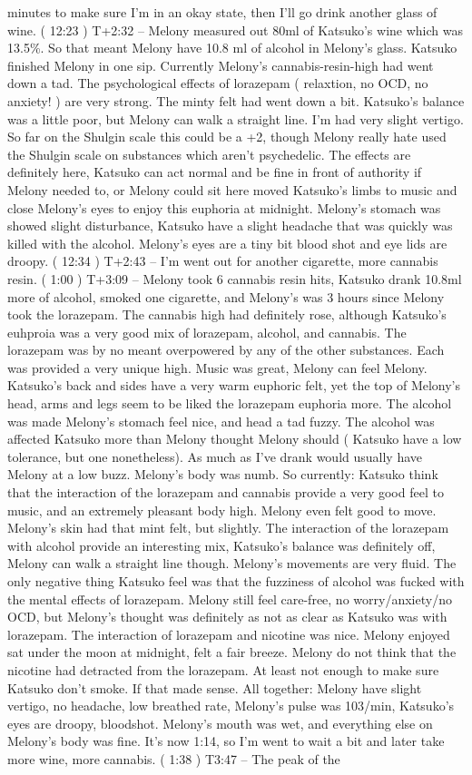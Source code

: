 \documentclass[12pt]{book}
\begin{document}
minutes to make sure I'm in an okay state, then I'll go drink another glass of wine. ( 12:23 ) T+2:32 -- Melony measured out 80ml of Katsuko's wine which was 13.5\%. So that meant Melony have 10.8 ml of alcohol in Melony's glass. Katsuko finished Melony in one sip. Currently Melony's cannabis-resin-high had went down a tad. The psychological effects of lorazepam ( relaxtion, no OCD, no anxiety! ) are very strong. The minty felt had went down a bit. Katsuko's balance was a little poor, but Melony can walk a straight line. I'm had very slight vertigo. So far on the Shulgin scale this could be a +2, though Melony really hate used the Shulgin scale on substances which aren't psychedelic. The effects are definitely here, Katsuko can act normal and be fine in front of authority if Melony needed to, or Melony could sit here moved Katsuko's limbs to music and close Melony's eyes to enjoy this euphoria at midnight. Melony's stomach was showed slight disturbance, Katsuko have a slight headache that was quickly was killed with the alcohol. Melony's eyes are a tiny bit blood shot and eye lids are droopy. ( 12:34 ) T+2:43 -- I'm went out for another cigarette, more cannabis resin. ( 1:00 ) T+3:09 -- Melony took 6 cannabis resin hits, Katsuko drank 10.8ml more of alcohol, smoked one cigarette, and Melony's was 3 hours since Melony took the lorazepam. The cannabis high had definitely rose, although Katsuko's euhproia was a very good mix of lorazepam, alcohol, and cannabis. The lorazepam was by no meant overpowered by any of the other substances. Each was provided a very unique high. Music was great, Melony can feel Melony. Katsuko's back and sides have a very warm euphoric felt, yet the top of Melony's head, arms and legs seem to be liked the lorazepam euphoria more. The alcohol was made Melony's stomach feel nice, and head a tad fuzzy. The alcohol was affected Katsuko more than Melony thought Melony should ( Katsuko have a low tolerance, but one nonetheless). As much as I've drank would usually have Melony at a low buzz. Melony's body was numb. So currently: Katsuko think that the interaction of the lorazepam and cannabis provide a very good feel to music, and an extremely pleasant body high. Melony even felt good to move. Melony's skin had that mint felt, but slightly. The interaction of the lorazepam with alcohol provide an interesting mix, Katsuko's balance was definitely off, Melony can walk a straight line though. Melony's movements are very fluid. The only negative thing Katsuko feel was that the fuzziness of alcohol was fucked with the mental effects of lorazepam. Melony still feel care-free, no worry/anxiety/no OCD, but Melony's thought was definitely as not as clear as Katsuko was with lorazepam. The interaction of lorazepam and nicotine was nice. Melony enjoyed sat under the moon at midnight, felt a fair breeze. Melony do not think that the nicotine had detracted from the lorazepam. At least not enough to make sure Katsuko don't smoke. If that made sense. All together: Melony have slight vertigo, no headache, low breathed rate, Melony's pulse was 103/min, Katsuko's eyes are droopy, bloodshot. Melony's mouth was wet, and everything else on Melony's body was fine. It's now 1:14, so I'm went to wait a bit and later take more wine, more cannabis. ( 1:38 ) T3:47 -- The peak of the 
\end{document}
